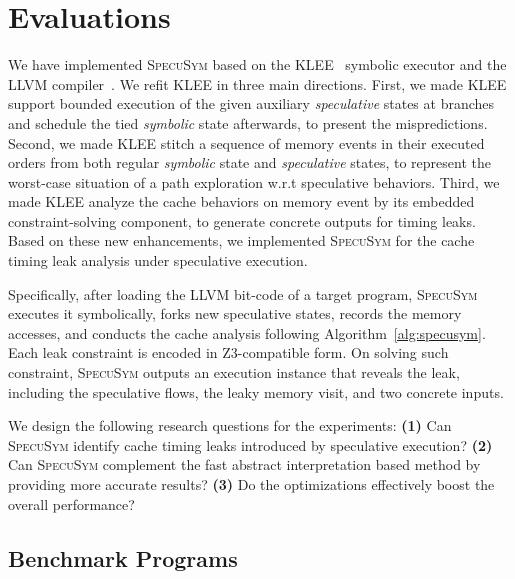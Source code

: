 \documentclass[sigconf, review]{acmart}
\newcommand{\SpecuSym}{\textsc{SpecuSym} }
\begin{document}
\section{Evaluations}
\label{sec:evaluation}


We have implemented \SpecuSym based on the KLEE~\cite{CadarDE08} symbolic 
executor and the LLVM compiler~\cite{LattnerA04}. We refit KLEE in three
main directions. First, we made KLEE support bounded execution of the given 
auxiliary \textit{speculative} states at branches and schedule the tied 
\textit{symbolic} state afterwards, to present the mispredictions. Second, 
we made KLEE stitch a sequence of memory events in their executed orders 
from both regular \textit{symbolic} state and \textit{speculative} states, 
to represent the worst-case situation of a path exploration w.r.t speculative 
behaviors. Third, we made KLEE analyze the cache behaviors on memory event 
by its embedded constraint-solving component, to generate concrete outputs 
for timing leaks. Based on these new enhancements, we implemented \SpecuSym 
for the cache timing leak analysis under speculative execution.

Specifically, after loading the LLVM bit-code of a target program, \SpecuSym 
executes it symbolically, forks new speculative states, records the memory 
accesses, and conducts the cache analysis following Algorithm~\ref{alg:specusym}. 
Each leak constraint is encoded in Z3-compatible form. On solving such constraint, 
\SpecuSym outputs an execution instance that reveals the leak, including the 
speculative flows, the leaky memory visit, and two concrete inputs. 

We design the following research questions for the experiments: \textbf{(1)} 
Can \SpecuSym identify cache timing leaks introduced by speculative execution?
\textbf{(2)} Can \SpecuSym complement the fast abstract interpretation based 
method by providing more accurate results? \textbf{(3)} Do the optimizations 
effectively boost the overall performance?


\subsection{Benchmark Programs}
\label{sec:benchs}
\end{document}
